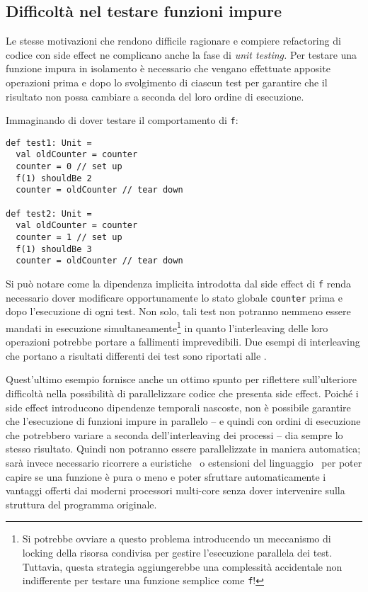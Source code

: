 \subsection{Difficoltà nel testare funzioni impure}
\label{subsection:difficolta-nel-testare-funzioni-impure}
Le stesse motivazioni che rendono difficile ragionare e compiere refactoring di codice con side effect ne complicano anche la fase di \emph{unit testing.}
Per testare una funzione impura in isolamento è necessario che vengano effettuate apposite operazioni prima e dopo lo svolgimento di ciascun test per garantire che il risultato non possa cambiare a seconda del loro ordine di esecuzione.

Immaginando di dover testare il comportamento di \lstinline{f}:
\begin{lstlisting}[language=scala3]
def test1: Unit =
  val oldCounter = counter
  counter = 0 // set up
  f(1) shouldBe 2
  counter = oldCounter // tear down

def test2: Unit =
  val oldCounter = counter
  counter = 1 // set up
  f(1) shouldBe 3
  counter = oldCounter // tear down
\end{lstlisting}
Si può notare come la dipendenza implicita introdotta dal side effect di \lstinline{f} renda necessario dover modificare opportunamente lo stato globale \lstinline{counter} prima e dopo l'esecuzione di ogni test.
Non solo, tali test non potranno nemmeno essere mandati in esecuzione simultaneamente\footnote{Si potrebbe ovviare a questo problema introducendo un meccanismo di locking della risorsa condivisa per gestire l'esecuzione parallela dei test. Tuttavia, questa strategia aggiungerebbe una complessità accidentale non indifferente per testare una funzione semplice come \lstinline{f}!} in quanto l'interleaving delle loro operazioni potrebbe portare a fallimenti imprevedibili.
Due esempi di interleaving che portano a risultati differenti dei test sono riportati alle .




Quest'ultimo esempio fornisce anche un ottimo spunto per riflettere sull'ulteriore difficoltà nella possibilità di parallelizzare codice che presenta side effect.
Poiché i side effect introducono dipendenze temporali nascoste, non è possibile garantire che l'esecuzione di funzioni impure in parallelo -- e quindi con ordini di esecuzione che potrebbero variare a seconda dell'interleaving dei processi -- dia sempre lo stesso risultato.
Quindi non potranno essere parallelizzate in maniera automatica; sarà invece necessario ricorrere a euristiche~\cite{cit:safe-automated-refactoring-for-intelligent-parallelization-of-java-8-streams} o estensioni del linguaggio~\cite{cit:pure-functions-in-c-a-small-keyword-for-automatic-parallelization} per poter capire se una funzione è pura o meno e poter sfruttare automaticamente i vantaggi offerti dai moderni processori multi-core senza dover intervenire sulla struttura del programma originale.
